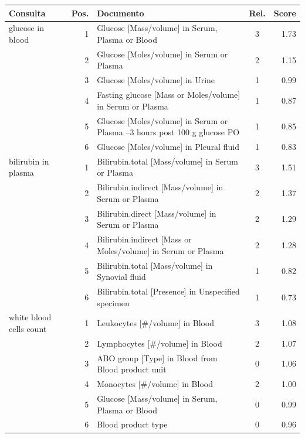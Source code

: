\begin{tabular}{lrp{7cm}cr}
\toprule
Consulta & Pos. & Documento & Rel. & Score \\
\midrule
glucose in blood & 1 & Glucose [Mass/volume] in Serum, Plasma or Blood & 3 & 1.73 \\
 & 2 & Glucose [Moles/volume] in Serum or Plasma & 2 & 1.15 \\
 & 3 & Glucose [Moles/volume] in Urine & 1 & 0.99 \\
 & 4 & Fasting glucose [Mass or Moles/volume] in Serum or Plasma & 1 & 0.87 \\
 & 5 & Glucose [Moles/volume] in Serum or Plasma --3 hours post 100 g glucose PO & 1 & 0.85 \\
 & 6 & Glucose [Moles/volume] in Pleural fluid & 1 & 0.83 \\
\midrule
bilirubin in plasma & 1 & Bilirubin.total [Mass/volume] in Serum or Plasma & 3 & 1.51 \\
 & 2 & Bilirubin.indirect [Mass/volume] in Serum or Plasma & 2 & 1.37 \\
 & 3 & Bilirubin.direct [Mass/volume] in Serum or Plasma & 2 & 1.29 \\
 & 4 & Bilirubin.indirect [Mass or Moles/volume] in Serum or Plasma & 2 & 1.28 \\
 & 5 & Bilirubin.total [Mass/volume] in Synovial fluid & 1 & 0.82 \\
 & 6 & Bilirubin.total [Presence] in Unspecified specimen & 1 & 0.73 \\
\midrule
white blood cells count & 1 & Leukocytes [\#/volume] in Blood & 3 & 1.08 \\
 & 2 & Lymphocytes [\#/volume] in Blood & 2 & 1.07 \\
 & 3 & ABO group [Type] in Blood from Blood product unit & 0 & 1.06 \\
 & 4 & Monocytes [\#/volume] in Blood & 2 & 1.00 \\
 & 5 & Glucose [Mass/volume] in Serum, Plasma or Blood & 0 & 0.99 \\
 & 6 & Blood product type & 0 & 0.96 \\
\bottomrule
\end{tabular}
